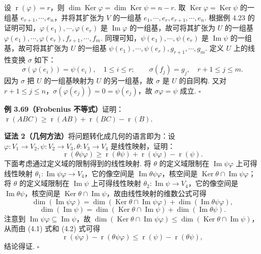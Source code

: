 \documentclass[UTF8, 12pt, fontset=fandol, oneside]{ctexart}
\begin{document}
设 $\operatorname{r}(\varphi)=r$，则 $\dim\operatorname{Ker}\varphi=\dim\operatorname{Ker}\psi=n-r$. 取 $\operatorname{Ker}\varphi=\operatorname{Ker}\psi$ 的一组基 $e_{r+1},\cdots,e_n$，并将其扩张为 $V$ 的一组基 $e_1,\cdots,e_r,e_{r+1},\cdots,e_n$. 根据例 4.23 的证明可知，$\varphi(e_1),\cdots,\varphi(e_r)$ 是 $\operatorname{Im}\varphi$ 的一组基，故可将其扩张为 $U$ 的一组基 $\varphi(e_1),\cdots,\varphi(e_r),f_{r+1},\cdots,f_m$. 同理可知，$\psi(e_1),\cdots,\psi(e_r)$ 是 $\operatorname{Im}\psi$ 的一组基，故可将其扩张为 $U$ 的一组基 $\psi(e_1),\cdots,\psi(e_r),g_{r+1},\cdots,g_m$. 定义 $U$ 上的线性变换 $\sigma$ 如下：
\[
\sigma(\varphi(e_i))=\psi(e_i),\quad 1\le i\le r;\qquad \sigma(f_j)=g_j,\quad r+1\le j\le m.
\]
因为 $\sigma$ 把 $U$ 的一组基映射为 $U$ 的另一组基，故 $\sigma$ 是 $U$ 的自同构. 又对 $r+1\le j\le n$，$\sigma(\varphi(e_j))=0=\psi(e_j)$，故 $\sigma\varphi=\psi$ 成立. $\square$

\noindent\textbf{例 3.69（Frobenius 不等式）}\quad 证明：$\operatorname{r}(ABC)\ge \operatorname{r}(AB)+\operatorname{r}(BC)-\operatorname{r}(B)$.

\noindent\textbf{证法 2（几何方法）}\quad 将问题转化成几何的语言即为：设 $\varphi:V_1\to V_2,\psi:V_2\to V_3,\theta:V_3\to V_4$ 是线性映射，证明：
\[
\operatorname{r}(\theta\psi\varphi)\ge \operatorname{r}(\theta\psi)+\operatorname{r}(\psi\varphi)-\operatorname{r}(\psi).
\]
下面考虑通过定义域的限制得到的线性映射. 将 $\theta$ 的定义域限制在 $\operatorname{Im}\psi\varphi$ 上可得线性映射 $\theta_1:\operatorname{Im}\psi\varphi\to V_4$，它的像空间是 $\operatorname{Im}\theta\psi\varphi$，核空间是 $\operatorname{Ker}\theta\cap\operatorname{Im}\psi\varphi$；将 $\theta$ 的定义域限制在 $\operatorname{Im}\psi$ 上可得线性映射 $\theta_2:\operatorname{Im}\psi\to V_4$，它的像空间是 $\operatorname{Im}\theta\psi$，核空间是 $\operatorname{Ker}\theta\cap\operatorname{Im}\psi$，故由线性映射的维数公式可得
\begin{equation}
\dim(\operatorname{Im}\psi\varphi)=\dim(\operatorname{Ker}\theta\cap\operatorname{Im}\psi\varphi)+\dim(\operatorname{Im}\theta\psi\varphi),
\tag{4.1}
\end{equation}
\begin{equation}
\dim(\operatorname{Im}\psi)=\dim(\operatorname{Ker}\theta\cap\operatorname{Im}\psi)+\dim(\operatorname{Im}\theta\psi).
\tag{4.2}
\end{equation}
注意到 $\operatorname{Im}\psi\varphi\subseteq\operatorname{Im}\psi$，故 $\dim(\operatorname{Ker}\theta\cap\operatorname{Im}\psi\varphi)\le \dim(\operatorname{Ker}\theta\cap\operatorname{Im}\psi)$，从而由 (4.1) 式和 (4.2) 式可得
\[
\operatorname{r}(\psi\varphi)-\operatorname{r}(\theta\psi\varphi)\le \operatorname{r}(\psi)-\operatorname{r}(\theta\psi),
\]
结论得证. $\square$
\end{document}
